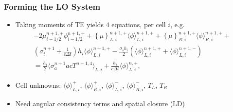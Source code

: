 \documentclass[xcolor=dvipsnames,hyperref={pdfpagelabels=false},unknownkeysallowed]{beamer}
\newcommand{\colb}[1]{{\color{blue} #1}}
\newlength{\wideitemsep}
\let\olditem\item
\renewcommand{\item}{\setlength{\itemsep}{\wideitemsep}\olditem}
\newcommand{\mom}[1]{\langle #1 \rangle}
\newcommand{\cur}[1]{\left\{ #1 \right\}}
\begin{document}
\begin{frame}
    \frametitle{Forming the LO System}
    \begin{itemize}
        \item Taking moments of TE yields \colb{4 equations}, per cell $i$, e.g.
\begin{multline}\label{lo_tran}
    -2{\mu}_{i-1/2}^{n+1,+} \phi_{i-1/2}^{n+1,+} + \cur {\mu}_{L,i}^{n+1,+}
  \mom{\phi}_{L,i}^{n+1,+}
  +  \cur\mu_{R,i}^{n+1,+}
  \mom{\phi}_{R,i}^{n+1,+} +  \\ \left(\sigma_t^{n+1}+\frac{1}{c \Delta t} \right) h_i 
  \mom{\phi}_{L,i}^{n+1,+} -  \frac{\sigma_s h_i}{2} \left( \mom{\phi}_{L,i}^{n+1,+} +
  \mom\phi_{L,i}^{n+1,-}\right) \\ = \frac{h_i}{2} \mom{\sigma_a^{n+1} a c T^{n+1,4}}_{L,i} +
  \frac{h_i}{c\Delta t}\mom{\phi}_{L,i}^{n,+},
\end{multline}
        \item Cell unknowns: $\mom{\phi}_{L,i}^{+}$, $\mom{\phi}_{R,i}^{+}$,
        $\mom{\phi}_{L,i}^{-}$, $\mom{\phi}_{R,i}^{-}$, $T_L$, $T_R$

    \item Need \colb{angular} consistency terms  and spatial closure
        (LD)
    \end{itemize}

\end{frame}
\end{document}
